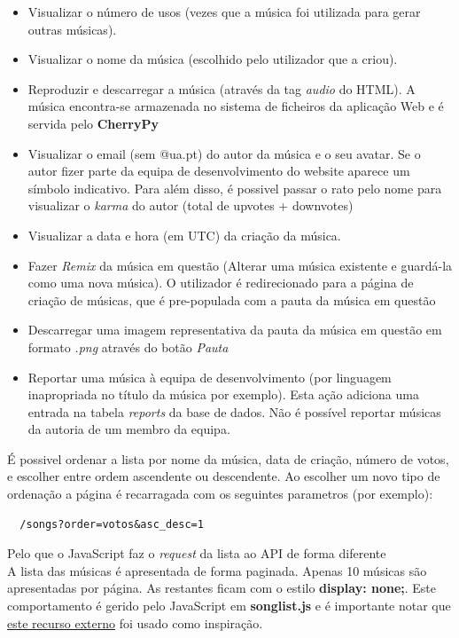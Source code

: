 \documentclass{report}
\begin{document}
\begin{itemize}
  \item Visualizar o número de usos (vezes que a música foi utilizada para gerar outras músicas).
  \item Visualizar o nome da música (escolhido pelo utilizador que a criou).
  \item Reproduzir e descarregar a música (através da tag \textit{audio} do HTML). A música encontra-se armazenada no sistema de ficheiros da aplicação Web e é servida pelo \textbf{CherryPy}
  \item Visualizar o email (sem @ua.pt) do autor da música e o seu avatar. Se o autor fizer parte da equipa de desenvolvimento do website aparece um símbolo indicativo. Para além disso, é possivel passar o rato pelo nome para visualizar o \textit{karma} do autor (total de upvotes + downvotes)
  \item Visualizar a data e hora (em UTC) da criação da música.
  \item Fazer \textit{Remix} da música em questão (Alterar uma música existente e guardá-la como uma nova música). O utilizador é redirecionado para a página de criação de músicas, que é pre-populada com a pauta da música em questão
  \item Descarregar uma imagem representativa da pauta da música em questão em formato \textit{.png} através do botão \textit{Pauta}
  \item Reportar uma música à equipa de desenvolvimento (por linguagem inapropriada no título da música por exemplo). Esta ação adiciona uma entrada na tabela \textit{reports} da base de dados. Não é possível reportar músicas da autoria de um membro da equipa.\\
\end{itemize}

É possivel ordenar a lista por nome da música, data de criação, número de votos, e escolher entre ordem ascendente ou descendente. Ao escolher um novo tipo de ordenação a página é recarragada com os seguintes parametros (por exemplo):
\begin{lstlisting}
  /songs?order=votos&asc_desc=1
\end{lstlisting}
Pelo que o JavaScript faz o \textit{request} da lista ao API de forma diferente \\

A lista das músicas é apresentada de forma paginada. Apenas 10 músicas são apresentadas por página. As restantes ficam com o estilo \textbf{display: none;}. Este comportamento é gerido pelo JavaScript em \textbf{songlist.js} e é importante notar que \href{https://jsfiddle.net/solodev/yw7y4wez/}{este recurso externo} foi usado como inspiração.
\end{document}
